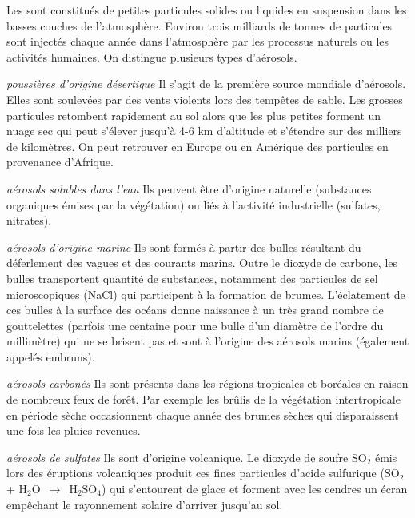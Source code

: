 \sk
Les  sont constitués de petites particules solides ou liquides en suspension dans les basses couches de l’atmosphère. Environ trois milliards de tonnes de particules sont injectés chaque année dans l’atmosphère par les processus naturels ou les activités humaines. On distingue plusieurs types d'aérosols.
\begin{citemize}
\item[\emph{poussières d'origine désertique}] Il s'agit de la première source mondiale d’aérosols. Elles sont soulevées par des vents violents lors des tempêtes de sable. Les grosses particules retombent rapidement au sol alors que les plus petites forment un nuage sec qui peut s’élever jusqu’à 4-6 km d’altitude et s’étendre sur des milliers de kilomètres. On peut retrouver en Europe ou en Amérique des particules en provenance d'Afrique.
\item[\emph{aérosols solubles dans l’eau}] Ils peuvent être d'origine naturelle (substances organiques émises par la végétation) ou liés à l'activité industrielle (sulfates, nitrates).
\item[\emph{aérosols d'origine marine}] Ils sont formés à partir des bulles résultant du déferlement des vagues et des courants marins. Outre le dioxyde de carbone, les bulles transportent quantité de substances, notamment des particules de sel microscopiques (NaCl) qui participent à la formation de brumes. L'éclatement de ces bulles à la surface des océans donne naissance à un très grand nombre de gouttelettes (parfois une centaine pour une bulle d'un diamètre de l'ordre du millimètre) qui ne se brisent pas et sont à l'origine des aérosols marins (également appelés embruns).
\item[\emph{aérosols carbonés}] Ils sont présents dans les régions tropicales et boréales en raison de nombreux feux de forêt. Par exemple les brûlis de la végétation intertropicale en période sèche occasionnent chaque année des brumes sèches qui disparaissent une fois les pluies revenues.
\item[\emph{aérosols de sulfates}] Ils sont d'origine volcanique. Le dioxyde de soufre SO$_2$ émis lors des éruptions volcaniques produit ces fines particules d'acide sulfurique (SO$_2$ + H$_2$O~$\rightarrow$~H$_2$SO$_4$) qui s'entourent de glace et forment avec les cendres un écran empêchant le rayonnement solaire d'arriver jusqu'au sol.
\end{citemize}
